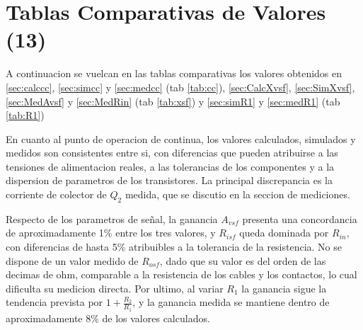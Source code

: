\documentclass[11pt,a4paper]{article}
\begin{document}
\newpage
\section{Tablas Comparativas de Valores (13)} 
A continuacion se vuelcan en las tablas comparativas los valores obtenidos en \ref{sec:calccc}, \ref{sec:simcc} y \ref{sec:medcc} (tab \ref{tab:cc}), \ref{sec:CalcXvsf}, \ref{sec:SimXvsf}, \ref{sec:MedAvsf} y \ref{sec:MedRin} (tab \ref{tab:xsf}) y \ref{sec:simR1} y \ref{sec:medR1} (tab \ref{tab:R1})

En cuanto al punto de operacion de continua, los valores calculados, simulados y medidos son consistentes entre si, con diferencias que pueden atribuirse a las tensiones de alimentacion reales, a las tolerancias de los componentes y a la dispersion de parametros de los transistores. La principal discrepancia es la corriente de colector de \(Q_2\) medida, que se discutio en la seccion de mediciones.

Respecto de los parametros de señal, la ganancia \(A_{vsf}\) presenta una concordancia de aproximadamente 1\% entre los tres valores, y \(R_{isf}\) queda dominada por \(R_{in}\), con diferencias de hasta 5\% atribuibles a la tolerancia de la resistencia. No se dispone de un valor medido de \(R_{osf}\), dado que su valor es del orden de las decimas de ohm, comparable a la resistencia de los cables y los contactos, lo cual dificulta su medicion directa. Por ultimo, al variar \(R_1\) la ganancia sigue la tendencia prevista por \(1 + \frac{R_2}{R_1}\), y la ganancia medida se mantiene dentro de aproximadamente 8\% de los valores calculados.
\end{document}
